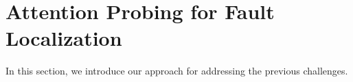 \section{Attention Probing for Fault Localization}
\label{sec:ourmethod}




In this section, we introduce our approach for addressing the previous challenges.


